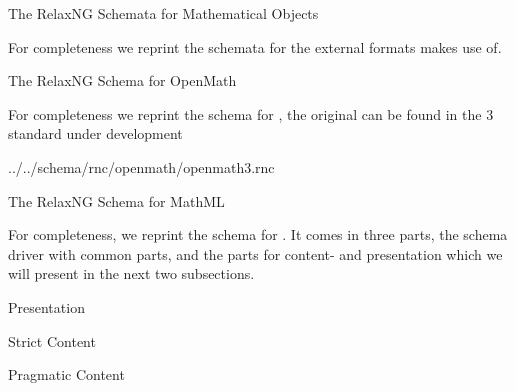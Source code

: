 
\begin{omgroup}[id=mobj-rnc]{The RelaxNG Schemata for Mathematical Objects}

For completeness we reprint the {\relaxng} schemata for the external formats
{\omdoc} makes use of.

\begin{omgroup}[id=rnc.openm]{The RelaxNG Schema for OpenMath}

For completeness we reprint the {\relaxng} schema for {\openmath}, the original can be
found in the {\openmath}3 standard under development


{../../schema/rnc/openmath/openmath3.rnc}
\end{omgroup}

\begin{omgroup}[id=rnc.mathml]{The RelaxNG Schema for MathML}

For completeness, we reprint the {\relaxng} schema for {\mathml}. It comes in three parts,
the schema driver with common parts, and the parts for content- and presentation {\mathml} which we will
present in the next two subsections.



\end{omgroup}

\begin{omgroup}[id=rnc.pmathml]{Presentation {\mathml}}

\end{omgroup}

\begin{omgroup}[id=rnc.cmathml]{Strict Content {\mathml}}
  
\end{omgroup}

\begin{omgroup}[id=rnc.cmathml]{Pragmatic Content {\mathml}}
  
\end{omgroup}
\end{omgroup}


